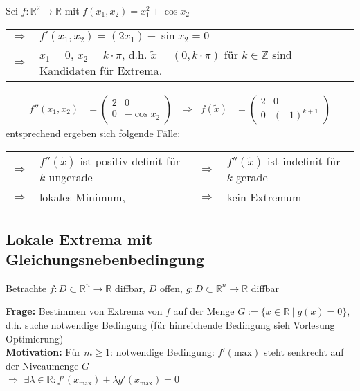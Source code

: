 \begin{example}
	Sei $f:\mathbb{R}^2\to\mathbb{R}$ mit $f(x_1, x_2) = x_1^2 + \cos x_2$ \\
	\begin{tabularx}{\linewidth}{r@{\ \ }X}
	$\Rightarrow$ & $f'(x_1, x_2) = (2x_1) - \sin x_2 = 0$ \\
	$\Rightarrow$  &$x_1 = 0$, $x_2 = k\cdot\pi$, d.h. $\tilde{x} = (0, k\cdot\pi)$ für $k\in\mathbb{Z}$ sind Kandidaten für Extrema.
	\end{tabularx} \begin{align*}
		f''(x_1, x_2) &= \begin{pmatrix}
			2 & 0 \\ 0 & -\cos x_2
		\end{pmatrix} & \Rightarrow\;\; f(\tilde{x}) &= \begin{pmatrix}
			2 & 0 \\ 0 & (-1)^{k+1}
		\end{pmatrix}
	\end{align*}
	entsprechend ergeben sich folgende Fälle:\\
	\begin{tabularx}{\linewidth}{r@{\ \ }Xr@{\ \ }X}
	$\Rightarrow$ & $f''(\tilde{x})$ ist positiv definit für $k$ ungerade & $\Rightarrow$ & $f''(\tilde{x})$ ist indefinit für $k$ gerade \\
	$\Rightarrow$ & lokales Minimum,&
	$\Rightarrow$ & kein Extremum
	\end{tabularx}
\end{example}

\subsection{Lokale Extrema mit Gleichungsnebenbedingung}
Betrachte $f:D\subset\mathbb{R}^n\to\mathbb{R}$ \gls{diffbar}, $D$ offen, $g:D\subset\mathbb{R}^n\to\mathbb{R}$ \gls{diffbar}

\textbf{Frage:} Bestimmen von Extrema von $f$ auf der Menge $G:= \{ x\in\mathbb{R}\mid g(x) = 0 \}$, d.h. suche notwendige Bedingung (für hinreichende Bedingung sieh Vorlesung Optimierung)\\

\textbf{Motivation:} Für $m\ge 1$: notwendige Bedingung: $f'(\mathrm{max})$ steht senkrecht auf der Niveaumenge $G$  \\
	$\Rightarrow$ $\exists\lambda\in\mathbb{R}: f'(x_{\max}) + \lambda g'(x_{\max}) = 0$

